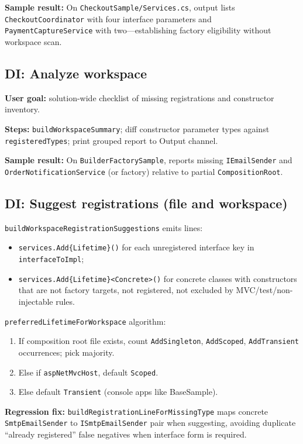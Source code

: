 \textbf{Sample result:} On \texttt{CheckoutSample/Services.cs}, output lists \texttt{CheckoutCoordinator} with four interface parameters and \texttt{PaymentCaptureService} with two---establishing factory eligibility without workspace scan.

\subsection{DI: Analyze workspace}

\textbf{User goal:} solution-wide checklist of missing registrations and constructor inventory.

\textbf{Steps:} \texttt{buildWorkspaceSummary}; diff constructor parameter types against \texttt{registeredTypes}; print grouped report to Output channel.

\textbf{Sample result:} On \texttt{BuilderFactorySample}, reports missing \texttt{IEmailSender} and \texttt{OrderNotificationService} (or factory) relative to partial \texttt{CompositionRoot}.

\subsection{DI: Suggest registrations (file and workspace)}

\texttt{buildWorkspaceRegistrationSuggestions} emits lines:
\begin{itemize}
	\item \texttt{services.Add\{Lifetime\}<IInterface, Impl>()} for each unregistered interface key in \texttt{interfaceToImpl};
	\item \texttt{services.Add\{Lifetime\}<Concrete>()} for concrete classes with constructors that are not factory targets, not registered, not excluded by MVC/test/non-injectable rules.
\end{itemize}

\texttt{preferredLifetimeForWorkspace} algorithm:
\begin{enumerate}
	\item If composition root file exists, count \texttt{AddSingleton}, \texttt{AddScoped}, \texttt{AddTransient} occurrences; pick majority.
	\item Else if \texttt{aspNetMvcHost}, default \texttt{Scoped}.
	\item Else default \texttt{Transient} (console apps like BaseSample).
\end{enumerate}

\textbf{Regression fix:} \texttt{buildRegistrationLineForMissingType} maps concrete \texttt{SmtpEmailSender} to \texttt{ISmtpEmailSender} pair when suggesting, avoiding duplicate ``already registered'' false negatives when interface form is required.

